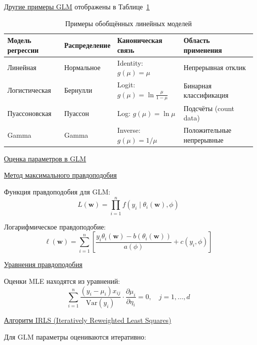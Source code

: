\underline{Другие примеры GLM} отображены в Таблице~\ref{tab:gen}

\begin{table}[h]
    \centering
    \begin{tabular}{|p{}|p{}|p{}|p{}|}
        \hline
        \textbf{Модель регрессии} & \textbf{Распределение} & \textbf{Каноническая связь}            & \textbf{Область применения} \\\hline
        Линейная                  & Нормальное             & Identity: $g(\mu) = \mu$               & Непрерывная отклик          \\\hline
        Логистическая             & Бернулли               & Logit: $g(\mu) = \ln\frac{\mu}{1-\mu}$ & Бинарная классификация      \\\hline
        Пуассоновская             & Пуассон                & Log: $g(\mu) = \ln\mu$                 & Подсчёты (count data)       \\\hline
        Gamma                     & Gamma                  & Inverse: $g(\mu) = 1/\mu$              & Положительные непрерывные   \\\hline
    \end{tabular}
    \caption{Примеры обобщённых линейных моделей}
    \label{tab:gen}
\end{table}

\underline{Оценка параметров в GLM}

\underline{Метод максимального правдоподобия}

Функция правдоподобия для GLM:
\[ L(\bm{w}) = \prod_{i=1}^n f(y_i \mid \theta_i(\bm{w}), \phi) \]

Логарифмическое правдоподобие:
\[ \ell(\bm{w}) = \sum_{i=1}^n \left[ \frac{y_i \theta_i(\bm{w}) - b(\theta_i(\bm{w}))}{a(\phi)} + c(y_i, \phi) \right] \]

\underline{Уравнения правдоподобия}

Оценки MLE находятся из уравнений:
\[ \sum_{i=1}^n \frac{(y_i - \mu_i) x_{ij}}{\text{Var}(y_i)} \cdot \frac{\partial \mu_i}{\partial \eta_i} = 0,
\quad j = 1, \dots, d \]

\underline{Алгоритм IRLS (Iteratively Reweighted Least Squares)}

Для GLM параметры оцениваются итеративно:


